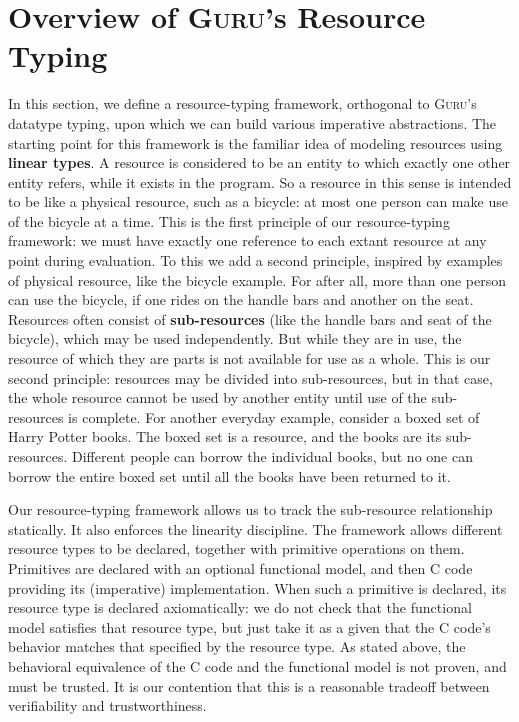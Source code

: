 \documentclass[9pt,natbib]{sigplanconf}
\begin{document}
\section{Overview of \textsc{Guru}'s Resource Typing}

In this section, we define a resource-typing framework, orthogonal to
\textsc{Guru}'s datatype typing, upon which we can build various
imperative abstractions.  The starting point for this framework is the
familiar idea of modeling resources using \textbf{linear types}.  A
resource is considered to be an entity to which exactly one other
entity refers, while it exists in the program.  So a resource in this
sense is intended to be like a physical resource, such as a bicycle:
at most one person can make use of the bicycle at a time.  This is the
first principle of our resource-typing framework: we must have exactly
one reference to each extant resource at any point during evaluation.
To this we add a second principle, inspired by examples of physical
resource, like the bicycle example.  For after all, more than one
person can use the bicycle, if one rides on the handle bars and
another on the seat.  Resources often consist of
\textbf{sub-resources} (like the handle bars and seat of the bicycle),
which may be used independently.  But while they are in use, the
resource of which they are parts is not available for use as a whole.
This is our second principle: resources may be divided into
sub-resources, but in that case, the whole resource cannot be used by
another entity until use of the sub-resources is complete.  For
another everyday example, consider a boxed set of Harry Potter books.
The boxed set is a resource, and the books are its sub-resources.
Different people can borrow the individual books, but no one can
borrow the entire boxed set until all the books have been returned to
it.

Our resource-typing framework allows us to track the sub-resource
relationship statically.  It also enforces the linearity discipline.
The framework allows different resource types to be declared, together
with primitive operations on them.  Primitives are declared with an
optional functional model, and then C code providing its (imperative)
implementation.  When such a primitive is declared, its resource type
is declared axiomatically: we do not check that the functional model
satisfies that resource type, but just take it as a given that the C
code's behavior matches that specified by the resource type.  As
stated above, the behavioral equivalence of the C code and the
functional model is not proven, and must be trusted.  It is our
contention that this is a reasonable tradeoff between verifiability
and trustworthiness.
\end{document}
